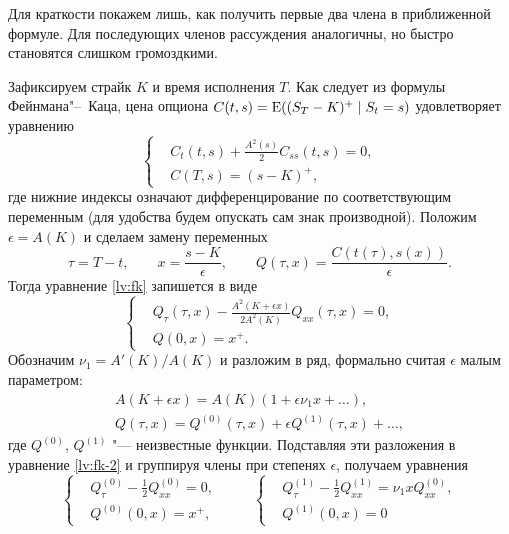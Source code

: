 Для краткости покажем лишь, как получить первые два члена в приближенной формуле.
Для последующих членов рассуждения аналогичны, но быстро становятся слишком громоздкими.

Зафиксируем страйк $K$ и время исполнения $T$.
Как следует из формулы Фейнмана"--~Каца, цена опциона $C(t,s) = \operatorname{E}((S_T-K)^+\mid S_t=s)$ удовлетворяет уравнению
\begin{equation}
\label{lv:fk}
\left\{
\begin{aligned}
&C_t(t,s) + \frac{A^2(s)}{2} C_{ss}(t,s) = 0,\\
&C(T,s) = (s-K)^+,
\end{aligned}
\right.
\end{equation}
где нижние индексы означают дифференцирование по соответствующим переменным (для удобства будем опускать сам знак производной).
Положим $\epsilon = A(K)$ и сделаем замену переменных
\begin{equation}
\label{lv:hw-change}
\tau = T-t, \qquad x = \frac{s-K}{\epsilon}, \qquad 
Q(\tau,x) = \frac{C(t(\tau), s(x))}{\epsilon}.
\end{equation}
Тогда уравнение \eqref{lv:fk} запишется в виде
\begin{equation}
\label{lv:fk-2}
\left\{
\begin{aligned}
&Q_\tau(\tau,x) - \frac{A^2(K+\epsilon x)}{2A^2(K)} Q_{xx}(\tau,x) = 0,\\
&Q(0,x) = x^+.
\end{aligned}
\right.
\end{equation}
Обозначим $\nu_1 = A'(K)/A(K)$ и разложим в ряд, формально считая $\epsilon$ малым параметром: 
\begin{gather*}
A(K+\epsilon x) 
  = A(K)(1+\epsilon\nu_1 x + \ldots),\\
Q(\tau,x) 
  = Q^{(0)}(\tau,x) + \epsilon Q^{(1)}(\tau,x)+ \ldots,
\end{gather*}
где $Q^{(0)}$, $Q^{(1)}$ "--- неизвестные функции. Подставляя эти разложения в уравнение \eqref{lv:fk-2} и группируя члены при степенях $\epsilon$, получаем уравнения
\[
\left\{
  \begin{aligned}
  &Q^{(0)}_\tau - \frac12 Q^{(0)}_{xx} = 0,\\
  &Q^{(0)}(0,x) = x^+,
  \end{aligned}
\right.\hspace{1cm}
\left\{
  \begin{aligned}
  &Q^{(1)}_\tau - \frac12 Q^{(1)}_{xx} = \nu_1 x Q^{(0)}_{xx},\\
  &Q^{(1)}(0,x) = 0
  \end{aligned}
\right.
\]
